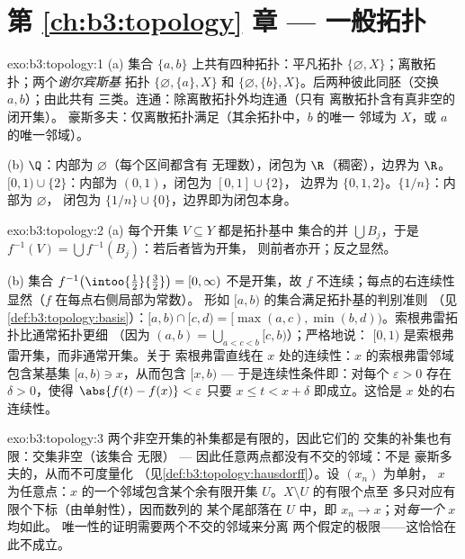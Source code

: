\section*{第 \ref{ch:b3:topology} 章 --- 一般拓扑}

\begin{solution}{exo:b3:topology:1}
(a) 集合 $\{a,b\}$ 上共有四种拓扑：平凡拓扑
$\{\varnothing, X\}$；离散拓扑；两个\emph{谢尔宾斯基}
拓扑 $\{\varnothing, \{a\}, X\}$ 和 $\{\varnothing,
\{b\}, X\}$。后两种彼此同胚（交换 $a, b$）；由此共有
三类。连通：除离散拓扑外均连通（只有
离散拓扑含有真非空的闭开集）。
豪斯多夫：仅离散拓扑满足（其余拓扑中，$b$ 的唯一
邻域为 $X$，或 $a$ 的唯一邻域）。

(b) $\Q$：内部为 $\varnothing$（每个区间都含有
无理数），闭包为 $\R$（稠密），边界为 $\R$。$[0,1)
\cup \{2\}$：内部为 $(0,1)$，闭包为 $[0,1]\cup\{2\}$，
边界为 $\{0, 1, 2\}$。$\{1/n\}$：内部为 $\varnothing$，
闭包为 $\{1/n\}\cup\{0\}$，边界即为闭包本身。
\end{solution}

\begin{solution}{exo:b3:topology:2}
(a) 每个开集 $V \subseteq Y$ 都是拓扑基中
集合的并 $\bigcup B_j$，于是 $f^{-1}(V) = \bigcup f^{-1}(B_j)$：若后者皆为开集，
则前者亦开；反之显然。

(b) 集合 $f^{-1}\bigl(\intoo{\frac12}{\frac32}\bigr) = [0, \infty)$
不是开集，故 $f$ 不连续；每点的右连续性
显然（$f$ 在每点右侧局部为常数）。
形如 $[a, b)$ 的集合满足拓扑基的判别准则
（见\cref{def:b3:topology:basis}）：$[a,b)\cap[c,d) = [\max(a,c),
\min(b,d))$。索根弗雷拓扑比通常拓扑更细
（因为 $(a, b) = \bigcup_{a < c < b}[c, b)$）；严格地说：
$[0,1)$ 是索根弗雷开集，而非通常开集。关于
索根弗雷直线在 $x$ 处的连续性：$x$ 的索根弗雷邻域
包含某基集 $[a, b) \ni x$，从而包含 $[x, b)$ ---
于是连续性条件即：对每个 $\varepsilon > 0$
存在 $\delta > 0$，使得 $\abs{f(t) - f(x)} < \varepsilon$
只要 $x \leq t < x + \delta$ 即成立。这恰是
$x$ 处的右连续性。
\end{solution}

\begin{solution}{exo:b3:topology:3}
两个非空开集的补集都是有限的，因此它们的
交集的补集也有限：交集非空（该集合
无限） --- 因此任意两点都没有不交的邻域：不是
豪斯多夫的，从而不可度量化
（见\cref{def:b3:topology:hausdorff}）。设 $(x_n)$ 为单射，
$x$ 为任意点：$x$ 的一个邻域包含某个余有限开集
$U$。$X\setminus U$ 的有限个点至
多只对应有限个下标（由单射性），因而数列的
某个尾部落在 $U$ 中，即 $x_n \to x$；对\emph{每一个} $x$ 均如此。
唯一性的证明需要两个不交的邻域来分离
两个假定的极限——这恰恰在此不成立。
\end{solution}

